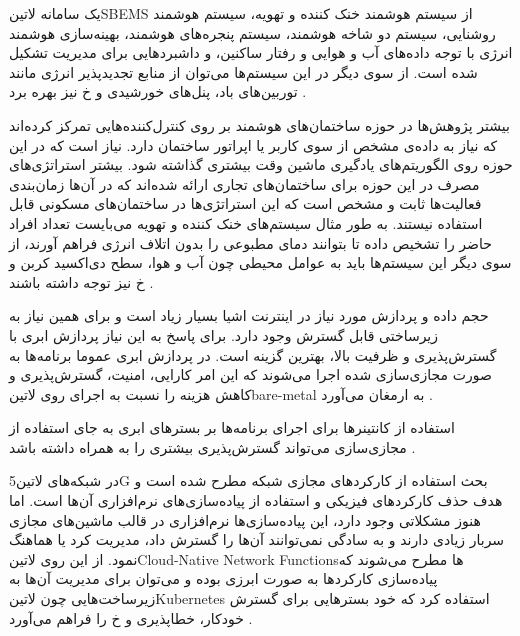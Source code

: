 یک سامانه ‌لاتین{SBEMS} از سیستم هوشمند خنک کننده و تهویه، سیستم هوشمند روشنایی، سیستم دو شاخه هوشمند،
سیستم پنجره‌های هوشمند، بهینه‌سازی هوشمند انرژی با توجه داده‌های آب و هوایی و رفتار ساکنین، و داشبردهایی برای مدیریت تشکیل شده است.
از سوی دیگر در این سیستم‌ها می‌توان از منابع تجدیدپذیر انرژی مانند توربین‌های باد، پنل‌های خورشیدی و ‌خ نیز بهره برد
.

بیشتر پژوهش‌ها در حوزه ساختمان‌های هوشمند بر روی کنترل‌کننده‌هایی تمرکز کرده‌اند که نیاز به داده‌ی مشخص از سوی کاربر یا اپراتور ساختمان دارد.
نیاز است که در این حوزه روی الگوریتم‌های یادگیری ماشین وقت بیشتری گذاشته شود.
بیشتر استراتژی‌های مصرف در این حوزه برای ساختمان‌های تجاری ارائه شده‌اند که در آن‌ها زمان‌بندی فعالیت‌ها ثابت و مشخص است که این استراتژی‌ها
در ساختمان‌های مسکونی قابل استفاده نیستند.
به طور مثال سیستم‌های خنک کننده و تهویه می‌بایست تعداد افراد حاضر را تشخیص داده تا بتوانند دمای مطبوعی را بدون اتلاف انرژی فراهم آورند،
از سوی دیگر این سیستم‌ها باید به عوامل محیطی چون آب و هوا، سطح دی‌اکسید کربن و ‌خ نیز توجه داشته باشند
.


حجم داده و پردازش مورد نیاز در اینترنت اشیا بسیار زیاد است و برای همین نیاز به زیرساختی قابل گسترش وجود دارد.
برای پاسخ به این نیاز پردازش ابری با گسترش‌پذیری و ظرفیت بالا، بهترین گزینه است.
در پردازش ابری عموما برنامه‌ها به صورت مجازی‌سازی شده اجرا می‌شوند که این امر کارایی، امنیت، گسترش‌پذیری و کاهش هزینه
را نسبت به اجرای روی ‌لاتین{bare-metal} به ارمغان می‌آورد
.

استفاده از کانتینرها برای اجرای برنامه‌ها بر بسترهای ابری به جای استفاده از مجازی‌سازی می‌تواند گسترش‌پذیری
بیشتری را به همراه داشته باشد
.

در شبکه‌های ‌لاتین{5G} بحث استفاده از کارکردهای مجازی شبکه مطرح شده است و هدف حذف کارکردهای فیزیکی
و استفاده از پیاده‌سازی‌های نرم‌افزاری آن‌ها است. اما هنوز مشکلاتی وجود دارد،
این پیاده‌سازی‌ها نرم‌افزاری در قالب ماشین‌های مجازی سربار زیادی دارند
و به سادگی نمی‌توانند آن‌ها را گسترش داد، مدیریت کرد یا هماهنگ نمود.
از این روی ‌لاتین{Cloud-Native Network Functions}ها مطرح می‌شوند که پیاده‌سازی کارکردها به صورت ابرزی بوده
و می‌توان برای مدیریت آن‌ها به زیرساخت‌هایی چون ‌لاتین{Kubernetes} استفاده کرد که خود بسترهایی برای
گسترش خودکار، خطاپذیری و ‌خ را فراهم می‌آورد
.
